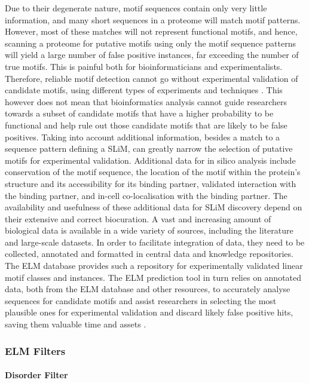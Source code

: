 \documentclass[12pt]{article}
\begin{document}
Due to their degenerate nature, motif sequences contain only very little
information, and many short sequences in a proteome will match motif patterns.
However, most of these matches will not represent functional motifs, and hence,
scanning a proteome for putative motifs using only the motif sequence
patterns will yield a large number of false positive instances, far exceeding
the number of true motifs.
This is painful both for bioinformaticians and experimentalists.
Therefore, reliable motif detection cannot go without
experimental validation of candidate motifs, using different types of
experiments and techniques \citep{26581338}. This however does not mean that
bioinformatics analysis cannot guide researchers towards a subset of candidate
motifs that have a higher probability to be functional and help rule out those
candidate motifs that are likely to be false positives. Taking into account
additional information, besides a match to a sequence pattern defining a SLiM,
can greatly narrow the selection of putative motifs for experimental validation.
Additional data for in silico analysis include conservation of the motif
sequence, the location of the motif within the protein's structure and its
accessibility for its binding partner, validated interaction with the binding
partner, and in-cell co-localisation with the binding partner. The availability
and usefulness of these additional data for SLiM discovery depend on their
extensive and correct biocuration. A vast and increasing amount of biological
data is available in a wide variety of sources, including the literature and
large-scale datasets. In order to facilitate integration of data, they need to
be collected, annotated and formatted in central data and knowledge
repositories. The ELM database provides such a repository for experimentally
validated linear motif classes and instances. The ELM prediction tool in turn
relies on annotated data, both from the ELM database and other resources, to
accurately analyse sequences for candidate motifs and assist researchers
in selecting the most plausible ones for experimental validation and discard
likely false positive hits, saving them valuable time and assets
\citep{22110040}.

\subsubsection*{ELM Filters}

\paragraph*{Disorder Filter}\label{DisorderFilter}
\end{document}
